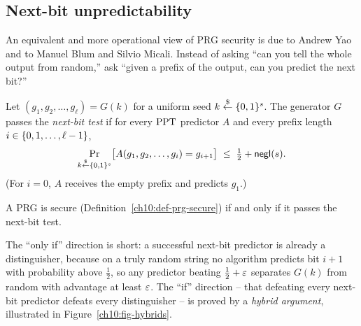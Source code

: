 \subsection{Next-bit unpredictability}
\label{ch10:next-bit}

An equivalent and more operational view of PRG security is due to Andrew Yao and to Manuel Blum and Silvio Micali. Instead of asking ``can you tell the whole output from random,'' ask ``given a prefix of the output, can you predict the next bit?''

\begin{definition}
\label{ch10:def-nextbit}
Let $(g_1, g_2, \dots, g_\ell) = G(k)$ for a uniform seed $k \stackrel{\$}{\gets} \{0,1\}^s$. The generator $G$ passes the \emph{next-bit test} if for every $\mathrm{PPT}$ predictor $A$ and every prefix length $i \in \{0, 1, \dots, \ell - 1\}$,
\[
  \Pr_{k \stackrel{\$}{\gets} \{0,1\}^s}\!\big[A(g_1, g_2, \dots, g_i) = g_{i+1}\big] \;\le\; \tfrac12 + \mathsf{negl}(s).
\]
(For $i = 0$, $A$ receives the empty prefix and predicts $g_1$.)
\end{definition}

\begin{theorem}[Yao]
\label{ch10:thm-yao}
A PRG is secure (Definition~\ref{ch10:def-prg-secure}) if and only if it passes the next-bit test.
\end{theorem}

The ``only if'' direction is short: a successful next-bit predictor is already a distinguisher, because on a truly random string no algorithm predicts bit $i{+}1$ with probability above $\tfrac12$, so any predictor beating $\tfrac12 + \varepsilon$ separates $G(k)$ from random with advantage at least $\varepsilon$. The ``if'' direction -- that defeating every next-bit predictor defeats every distinguisher -- is proved by a \emph{hybrid argument}, illustrated in Figure~\ref{ch10:fig-hybrids}.

